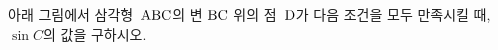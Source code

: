 아래 그림에서 삼각형~$\mathrm{ABC}$의 변 $\mathrm{BC}$ 위의 점~$\mathrm{D}$가 다음 조건을 모두 만족시킬 때, $\sin C$의 값을 구하시오. 
\par\smallskip\begin{center}\resizebox{\ifdim\width>\linewidth\linewidth\else\width\fi}{!}{}\end{center}
